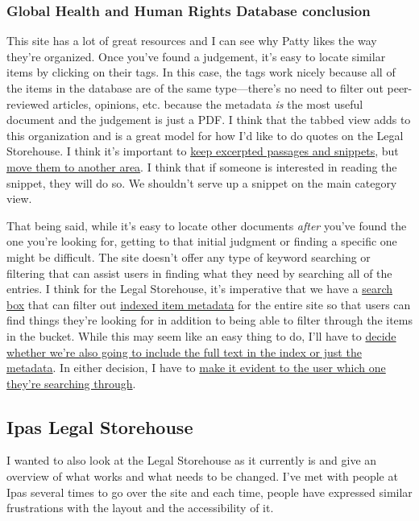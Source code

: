 \documentclass{article}
\begin{document}
\subsubsection{Global Health and Human Rights Database conclusion}
This site has a lot of great resources and I can see why Patty likes the way they're organized. Once you've found a judgement, it's easy to locate similar items by clicking on their tags. In this case, the tags work nicely because all of the items in the database are of the same type---there's no need to filter out peer-reviewed articles, opinions, etc. because the metadata \textit{is} the most useful document and the judgement is just a PDF. I think that the tabbed view adds to this organization and is a great model for how I'd like to do quotes on the Legal Storehouse. I think it's important to \ul{keep excerpted passages and snippets}, but \ul{move them to another area}. I think that if someone is interested in reading the snippet, they will do so. We shouldn't serve up a snippet on the main category view.

That being said, while it's easy to locate other documents \textit{after} you've found the one you're looking for, getting to that initial judgment or finding a specific one might be difficult. The site doesn't offer any type of keyword searching or filtering that can assist users in finding what they need by searching all of the entries. I think for the Legal Storehouse, it's imperative that we have a \ul{search box} that can filter out \ul{indexed item metadata} for the entire site so that users can find things they're looking for in addition to being able to filter through the items in the bucket. While this may seem like an easy thing to do, I'll have to \ul{decide whether we're also going to include the full text in the index or just the metadata}. In either decision, I have to \ul{make it evident to the user which one they're searching through}. 

\subsection{Ipas Legal Storehouse}
I wanted to also look at the Legal Storehouse as it currently is and give an overview of what works and what needs to be changed. I've met with people at Ipas several times to go over the site and each time, people have expressed similar frustrations with the layout and the accessibility of it. 
\end{document}
